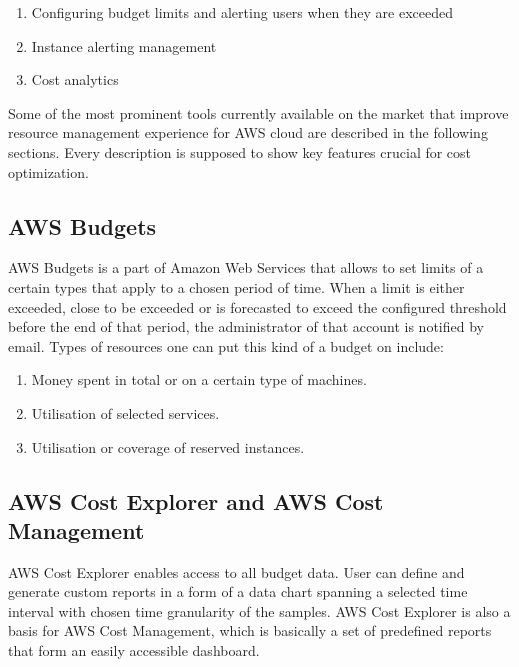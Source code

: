 \documentclass[licencjacka,en]{thesisclass}
\begin{document}
    \begin{enumerate}
        \item Configuring budget limits and alerting users when they are exceeded
        \item Instance alerting management
        \item Cost analytics
    \end{enumerate}

    Some of the most prominent tools currently available on the market that improve resource management experience for AWS cloud are described in the following sections.
    Every description is supposed to show key features crucial for cost optimization.

    \subsection{AWS Budgets}

    AWS Budgets\cite{AWSDocs} is a part of Amazon Web Services that allows to set limits of a certain types
    that apply to a chosen period of time.
    When a limit is either exceeded, close to be exceeded or is forecasted to exceed the configured threshold
    before the end of that period, the administrator of that account is notified by email.
    Types of resources one can put this kind of a budget on include:

    \begin{enumerate}
        \item Money spent in total or on a certain type of machines.
        \item Utilisation of selected services.
        \item Utilisation or coverage of reserved instances.
    \end{enumerate}

    \subsection{AWS Cost Explorer and AWS Cost Management}

    AWS Cost Explorer\cite{CostExplorer} enables access to all budget data.
    User can define and generate custom reports in a form of a data chart spanning a selected time interval with chosen time granularity of the samples.
    AWS Cost Explorer is also a basis for AWS Cost Management, which is basically a set of predefined reports that form an easily accessible dashboard.
\end{document}
